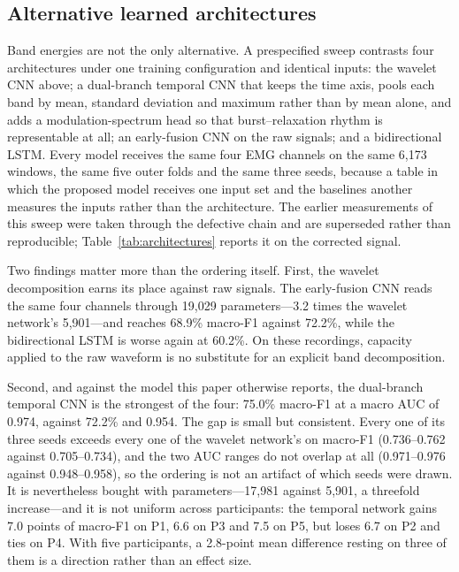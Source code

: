 \documentclass[pdflatex,sn-nature,iicol]{sn-jnl}
\begin{document}

\subsection{Alternative learned architectures}
\label{sec:deep_baselines}

Band energies are not the only alternative. A prespecified sweep contrasts four architectures under one training configuration and identical inputs: the wavelet CNN above; a dual-branch temporal CNN that keeps the time axis, pools each band by mean, standard deviation and maximum rather than by mean alone, and adds a modulation-spectrum head so that burst--relaxation rhythm is representable at all; an early-fusion CNN on the raw signals; and a bidirectional LSTM. Every model receives the same four EMG channels on the same 6,173 windows, the same five outer folds and the same three seeds, because a table in which the proposed model receives one input set and the baselines another measures the inputs rather than the architecture. The earlier measurements of this sweep were taken through the defective chain and are superseded rather than reproducible; Table~\ref{tab:architectures} reports it on the corrected signal.

Two findings matter more than the ordering itself. First, the wavelet decomposition earns its place against raw signals. The early-fusion CNN reads the same four channels through 19,029 parameters---3.2 times the wavelet network's 5,901---and reaches 68.9\% macro-F1 against 72.2\%, while the bidirectional LSTM is worse again at 60.2\%. On these recordings, capacity applied to the raw waveform is no substitute for an explicit band decomposition.

Second, and against the model this paper otherwise reports, the dual-branch temporal CNN is the strongest of the four: 75.0\% macro-F1 at a macro AUC of 0.974, against 72.2\% and 0.954. The gap is small but consistent. Every one of its three seeds exceeds every one of the wavelet network's on macro-F1 (0.736--0.762 against 0.705--0.734), and the two AUC ranges do not overlap at all (0.971--0.976 against 0.948--0.958), so the ordering is not an artifact of which seeds were drawn. It is nevertheless bought with parameters---17,981 against 5,901, a threefold increase---and it is not uniform across participants: the temporal network gains 7.0 points of macro-F1 on P1, 6.6 on P3 and 7.5 on P5, but loses 6.7 on P2 and ties on P4. With five participants, a 2.8-point mean difference resting on three of them is a direction rather than an effect size.
\end{document}
